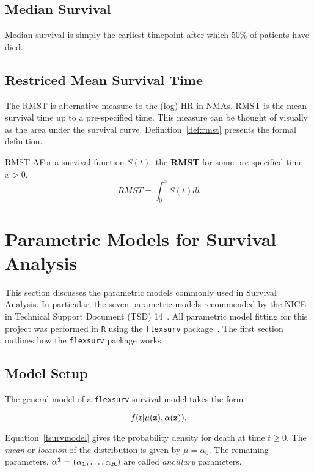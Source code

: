 \subsection{Median Survival}
Median survival is simply the earliest timepoint after which 50\% of patients have died. 

\subsection{Restriced Mean Survival Time}
The RMST is alternative measure to the (log) HR in NMAs. RMST is the mean survival time up to a pre-specified time. This measure can be thought of visually as the area under the survival curve. Definition~\ref{def:rmst} presents the formal definition.


\begin{definition}{RMST}
    AFor a survival function $S(t)$, the \textbf{RMST} for some pre-specified time $x > 0$,
    \[
        RMST = \int_{0}^{x} S(t)dt
    \] 
    \label{def:rmst}
\end{definition}

\section{Parametric Models for Survival Analysis}
This section discusses the parametric models commonly used in Survival Analysis. In particular, the seven parametric models recommended by the NICE in Technical Support Document (TSD) 14~\cite{tsd14}. All parametric model fitting for this project was performed in \verb|R| using the \verb|flexsurv| package~\cite{flexsurv}. The first section outlines how the \verb|flexsurv| package works.

\subsection{Model Setup}
The general model of a \verb|flexsurv| survival model takes the form 

\begin{equation}
    \label{fsurvmodel}
    f(t|\mu(\bf{z}), \bf{\alpha}(\bf{z})).
\end{equation}

Equation~\ref{fsurvmodel} gives the probability density for death at time $t \geq 0$. The \textit{mean} or \textit{location} of the distribution is given by $\mu = \alpha_0$. The remaining parameters, $\bf{\alpha^1} = (\alpha_1, \ldots, \alpha_R)$ are called \textit{ancillary} parameters. \\

